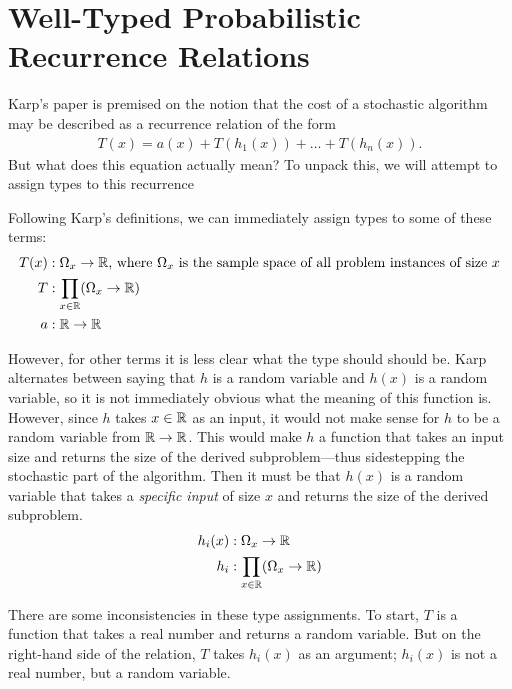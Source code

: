 \chapter{Well-Typed Probabilistic Recurrence Relations}
Karp's paper is premised on the notion that the cost of a stochastic algorithm may be described as a
recurrence relation of the form
\begin{align*}
T(x) = a(x) + T(h_1(x)) + \dots + T(h_n(x)).
\end{align*}
But what does this equation actually mean? To unpack this, we will attempt to assign types to this recurrence

 Following Karp's definitions, we can immediately assign types to some of these terms:
\begin{align*}
T(x) &: \Omega_x \rightarrow \mathbb{R} \text{, where } \Omega_x \text{ is the sample space of all problem instances of size } x \\
T &: \prod_{x \in \mathbb{R}} (\Omega_x \rightarrow \mathbb{R}) \\ 
a &: \mathbb{R} \rightarrow \mathbb{R}
\end{align*}

However, for other terms it is less clear what the type should should be. Karp alternates between saying that $h$ is a random 
variable and $h(x)$ is a random variable, so it is not immediately obvious 
what the meaning of this function is. However, since $h$ takes $x \in \mathbb{R}$ as an input, it would not make sense for $h$ to be a 
random variable from $\mathbb{R} \rightarrow \mathbb{R}$. This would make $h$ a function that takes an input size and returns the 
size of the derived subproblem---thus sidestepping the stochastic part of the algorithm. Then it must be that $h(x)$ is a random
variable that takes a \emph{specific input} of size $x$ and returns the size of the derived subproblem.
\begin{align*}
h_i(x) &: \Omega_x \rightarrow \mathbb{R} \\
h_i &: \prod_{x \in \mathbb{R}}(\Omega_x \rightarrow \mathbb{R}) 
\end{align*} 

There are some inconsistencies in these type assignments. To start, $T$ is a function that takes a real number and 
returns a random variable. But on the right-hand side of the relation, $T$ takes $h_i(x)$ as an argument; $h_i(x)$ is
not a real number, but a random variable. 

